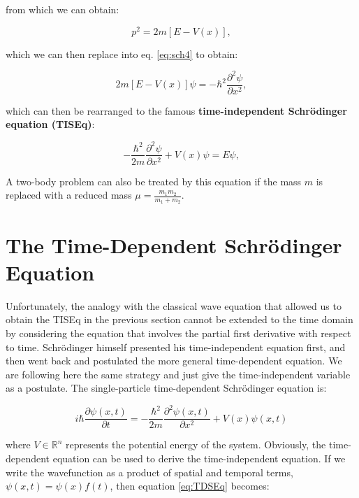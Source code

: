 \documentclass[
  9pt,
]{extbook}
\theoremstyle{definition}
\theoremstyle{definition}
\theoremstyle{definition}
\theoremstyle{remark}
\begin{document}
from which we can obtain:

\begin{equation}
p^2 = 2m[E - V(x)],
\label{eq:sch6}
\end{equation}

which we can then replace into eq. \eqref{eq:sch4} to obtain:

\begin{equation}
2m[E-V(x)]\psi = - \hbar^2 \frac{\partial^2 \psi}{\partial x^2},
\label{eq:sch7}
\end{equation}

which can then be rearranged to the famous \textbf{time-independent Schrödinger equation (TISEq)}:

\begin{equation}
- \frac{\hbar^2}{2m} \frac{\partial^2 \psi}{\partial x^2} + V(x) \psi = E\psi,
\label{eq:TISEq}
\end{equation}

A two-body problem can also be treated by this equation if the mass \(m\) is replaced with a reduced mass \(\mu = \frac{m_1 m_2}{m_1+m_2}\).

\hypertarget{the-time-dependent-schruxf6dinger-equation}{%
\section{The Time-Dependent Schrödinger Equation}\label{the-time-dependent-schruxf6dinger-equation}}

Unfortunately, the analogy with the classical wave equation that allowed us to obtain the TISEq in the previous section cannot be extended to the time domain by considering the equation that involves the partial first derivative with respect to time. Schrödinger himself presented his time-independent equation first, and then went back and postulated the more general time-dependent equation. We are following here the same strategy and just give the time-independent variable as a postulate. The single-particle time-dependent Schrödinger equation is:

\begin{equation}
i\hbar\frac{\partial \psi(x,t)}{\partial t}=-\frac{\hbar^2}{2m} \frac{\partial^2 \psi(x,t)}{\partial x^2}+V(x)\psi(x,t)
\label{eq:TDSEq}
\end{equation}

where \(V \in \mathbb{R}^{n}\) represents the potential energy of the system.
Obviously, the time-dependent equation can be used to derive the time-independent equation. If we write the wavefunction as a product of spatial and temporal terms, \(\psi(x, t) = \psi(x) f(t)\), then equation \eqref{eq:TDSEq} becomes:
\end{document}
